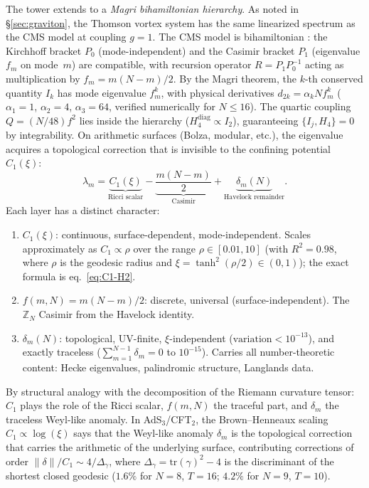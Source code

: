 The tower extends to a \emph{Magri bihamiltonian hierarchy}.
As noted in \S\ref{sec:graviton}, the Thomson vortex system has the same linearized
spectrum as the CMS model at coupling $g = 1$.
The CMS model is bihamiltonian
\citep{OlshanetskyPerelomov1976}:
the Kirchhoff bracket $P_0$ (mode-independent) and the
Casimir bracket $P_1$ (eigenvalue $f_m$ on mode~$m$) are
compatible, with recursion operator $R = P_1 P_0^{-1}$
acting as multiplication by $f_m = m(N{-}m)/2$.
By the Magri theorem, the $k$-th conserved quantity $I_k$
has mode eigenvalue $f_m^k$,
with physical derivatives
$d_{2k} = \alpha_k N f_m^k$
($\alpha_1 = 1$, $\alpha_2 = 4$, $\alpha_3 = 64$,
verified numerically for $N \le 16$).
The quartic coupling $Q = (N/48)f^2$ lies inside the hierarchy
($H_4^{\mathrm{diag}} \propto I_2$), guaranteeing
$\{I_j, H_4\} = 0$ by integrability.
On arithmetic surfaces (Bolza, modular, etc.), the eigenvalue
acquires a topological correction that is invisible to the
confining potential $C_1(\xi)$:
\begin{equation}\label{eq:three-layer}
  \lambda_m = \underbrace{C_1(\xi)}_{\text{Ricci scalar}}
    - \underbrace{\frac{m(N{-}m)}{2}}_{\text{Casimir}}
    + \underbrace{\delta_m(N)}_{\text{Havelock remainder}}.
\end{equation}
Each layer has a distinct character:
\begin{enumerate}
\item $C_1(\xi)$: continuous, surface-dependent, mode-independent.
  Scales approximately as $C_1 \propto \rho$ over the range
  $\rho \in [0.01, 10]$ (with $R^2 = 0.98$,
  where $\rho$ is the geodesic radius
  and $\xi = \tanh^2(\rho/2) \in (0,1)$);
  the exact formula is eq.~\eqref{eq:C1-H2}.
\item $f(m,N) = m(N{-}m)/2$: discrete, universal (surface-independent).
  The $\mathbb{Z}_N$ Casimir from the Havelock identity.
\item $\delta_m(N)$: topological, UV-finite, $\xi$-independent
  ($\text{variation} < 10^{-13}$), and exactly traceless
  ($\sum_{m=1}^{N-1} \delta_m = 0$ to $10^{-15}$).
  Carries all number-theoretic content: Hecke eigenvalues,
  palindromic structure, Langlands data.
\end{enumerate}
By structural analogy with the decomposition of the Riemann
curvature tensor: $C_1$ plays the role of the Ricci scalar,
$f(m,N)$ the traceful part, and $\delta_m$ the traceless Weyl-like
anomaly.
In AdS$_3$/CFT$_2$, the Brown--Henneaux scaling
$C_1 \propto \log(\xi)$ says that
the Weyl-like anomaly $\delta_m$ is the topological correction
that carries the arithmetic of the underlying surface, contributing
corrections of order $\|\delta\|/C_1 \sim 4/\Delta_\gamma$,
where $\Delta_\gamma = \mathrm{tr}(\gamma)^2 - 4$ is the discriminant
of the shortest closed geodesic ($1.6\%$ for $N = 8$,
$T = 16$; $4.2\%$ for $N = 9$, $T = 10$).

